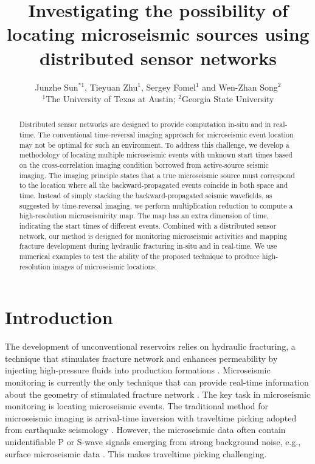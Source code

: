 \title{Investigating the possibility of locating microseismic sources using distributed sensor networks}
\author{Junzhe Sun$^{*1}$, Tieyuan Zhu$^1$, Sergey Fomel$^1$ and Wen-Zhan Song$^{2}$
\\
$^1$The University of Texas at Austin; $^2$Georgia State University}

\maketitle


\begin{abstract}
Distributed sensor networks are designed to provide computation in-situ and in real-time. The conventional time-reversal imaging approach for microseismic event location may not be optimal for such an environment. To address this challenge, we develop a methodology of locating multiple microseismic events with unknown start times based on the cross-correlation imaging condition borrowed from active-source seismic imaging. The imaging principle states that a true microseismic source must correspond to the location where all the backward-propagated events coincide in both space and time. Instead of simply stacking the backward-propagated seismic wavefields, as suggested by time-reversal imaging, we perform multiplication reduction to compute a high-resolution microseismicity map. The map has an extra dimension of time, indicating the start times of different events. Combined with a distributed sensor network, our method is designed for monitoring microseismic activities and mapping fracture development during hydraulic fracturing in-situ and in real-time. We use numerical examples to test the ability of the proposed technique to produce high-resolution images of microseismic locations.
\end{abstract}

\section{Introduction}
The development of unconventional reservoirs relies on hydraulic fracturing, a technique that stimulates fracture network and enhances permeability by injecting high-pressure fluids into production formations \cite[]{montgomery10}. Microseismic monitoring is currently the only technique that can provide real-time information about the geometry of stimulated fracture network \cite[]{maxwellbook}. The key task in microseismic monitoring is locating microseismic events. The traditional method for microseismic imaging is arrival-time inversion with traveltime picking adopted from earthquake seismology \cite[]{gibowicz13}. However, the microseismic data often contain unidentifiable P or S-wave signals emerging from strong background noise, e.g., surface microseismic data \cite[]{duncan10}. This makes traveltime picking challenging.

